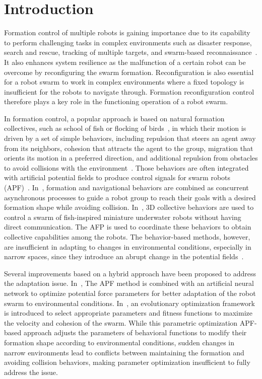 \section{Introduction}
Formation control of multiple robots is gaining importance due to its capability to perform challenging tasks in complex environments such as disaster response, search and rescue, tracking of multiple targets, and swarm-based reconnaissance~\cite{9306908,Oh2015}. It also enhances system resilience as the malfunction of a certain robot can be overcome by reconfiguring the swarm formation. Reconfiguration is also essential for a robot swarm to work in complex environments where a fixed topology is insufficient for the robots to navigate through. Formation reconfiguration control therefore plays a key role in the functioning operation of a robot swarm.

In formation control, a popular approach is based on natural formation collectives, such as school of fish or flocking of birds~\cite {Nagy2010}, in which their motion is driven by a set of simple behaviors, including repulsion that steers an agent away from its neighbors, cohesion that attracts the agent to the group, migration that orients its motion in a preferred direction, and additional repulsion from obstacles to avoid collisions with the environment~\cite{Reynolds1987}. Those behaviors are often integrated with artificial potential fields to produce control signals for swarm robots (APF)~\cite{736776,Berlinger2021,9565893}. In~\cite{736776}, formation and navigational behaviors are combined as concurrent
asynchronous processes to guide a robot group to reach their goals with a desired formation shape while avoiding collision. In~\cite{Berlinger2021}, 3D collective behaviors are used to control a swarm of fish-inspired miniature underwater robots without having direct communication. The AFP is used to coordinate these behaviors to obtain collective capabilities among the robots. The behavior-based methods, however, are insufficient in adapting to changes in environmental conditions, especially in narrow spaces, since they introduce an abrupt change in the potential fields~\cite{Zhang2023}.

Several improvements based on a hybrid approach have been proposed to address the adaptation issue. In~\cite{Elkilany2020}, The APF method is combined with an artificial neural network to optimize potential force parameters for better adaptation of the robot swarm to environmental conditions. In~\cite{Vsrhelyi2018}, an evolutionary optimization framework is introduced to select appropriate parameters and fitness functions to maximize the velocity and cohesion of the swarm. While this parametric optimization APF-based approach adjusts the parameters of behavioral functions to modify their formation shape according to environmental conditions, sudden changes in narrow environments lead to conflicts between maintaining the formation and avoiding collision behaviors, making parameter optimization insufficient to fully address the issue. 

